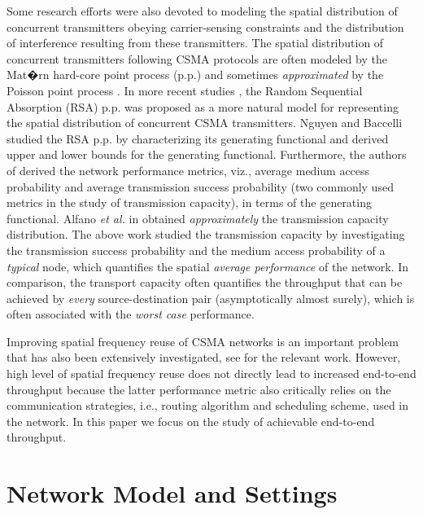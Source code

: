 \documentclass[english]{IEEEtran}
\theoremstyle{plain}
\theoremstyle{plain}
\theoremstyle{plain}
\theoremstyle{remark}
\begin{document}
Some research efforts were also devoted to modeling the spatial distribution
of concurrent transmitters obeying carrier-sensing constraints and
the distribution of interference resulting from these transmitters.
The spatial distribution of concurrent transmitters following CSMA
protocols are often modeled by the Mat�rn hard-core point process
(p.p.) and sometimes \emph{approximated} by the Poisson point process
\cite{Nguyen12On,Busson09Point,Baccelli09Stochastic,Haenggi09Interference,Haenggi11Mean}.
In more recent studies \cite{Busson09Point,Alfano11New,Haenggi11Mean},
the Random Sequential Absorption (RSA) p.p. was proposed as a more
natural model for representing the spatial distribution of concurrent
CSMA transmitters. Nguyen and Baccelli \cite{Nguyen12On} studied
the RSA p.p. by characterizing its generating functional and derived
upper and lower bounds for the generating functional. Furthermore,
the authors of \cite{Nguyen12On} derived the network performance
metrics, viz., average medium access probability and average transmission
success probability (two commonly used metrics in the study of transmission
capacity), in terms of the generating functional. Alfano \emph{et
al.} in \cite{Alfano11New} obtained \emph{approximately} the transmission
capacity distribution. The above work \cite{Nguyen12On,Alfano11New}
studied the transmission capacity by investigating the transmission
success probability and the medium access probability of a \emph{typical}
node, which quantifies the spatial \emph{average performance} of the
network. In comparison, the transport capacity often quantifies the
throughput that can be achieved by \emph{every} source-destination
pair (asymptotically almost surely), which is often associated with
the \emph{worst case} performance.

Improving spatial frequency reuse of CSMA networks is an important
problem that has also been extensively investigated, see \cite{Alawieh09Improving,Kim08Understanding,Lin07Interplay}
for the relevant work. However, high level of spatial frequency reuse
does not directly lead to increased end-to-end throughput because
the latter performance metric also critically relies on the communication
strategies, i.e., routing algorithm and scheduling scheme, used in
the network. In this paper we focus on the study of achievable end-to-end
throughput.


\section{Network Model and Settings\label{sec:Network-Model}}
\end{document}
